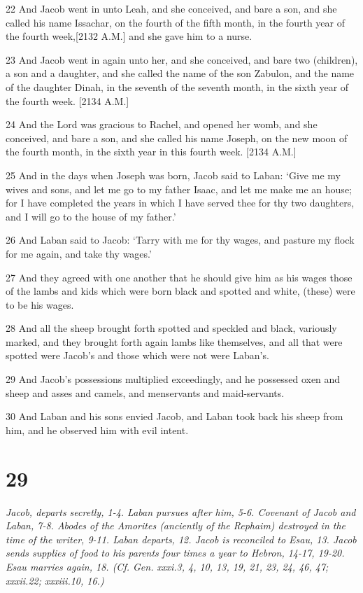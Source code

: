 \par 22 And Jacob went in unto Leah, and she conceived, and bare a son, and she called his name Issachar, on the fourth of the fifth month, in the fourth year of the fourth week,[2132 A.M.] and she gave him to a nurse.
\par 23 And Jacob went in again unto her, and she conceived, and bare two (children), a son and a daughter, and she called the name of the son Zabulon, and the name of the daughter Dinah, in the seventh of the seventh month, in the sixth year of the fourth week. [2134 A.M.]
\par 24 And the Lord was gracious to Rachel, and opened her womb, and she conceived, and bare a son, and she called his name Joseph, on the new moon of the fourth month, in the sixth year in this fourth week. [2134 A.M.]
\par 25 And in the days when Joseph was born, Jacob said to Laban: ‘Give me my wives and sons, and let me go to my father Isaac, and let me make me an house; for I have completed the years in which I have served thee for thy two daughters, and I will go to the house of my father.’
\par 26 And Laban said to Jacob: ‘Tarry with me for thy wages, and pasture my flock for me again, and take thy wages.’
\par 27 And they agreed with one another that he should give him as his wages those of the lambs and kids which were born black and spotted and white, (these) were to be his wages.
\par 28 And all the sheep brought forth spotted and speckled and black, variously marked, and they brought forth again lambs like themselves, and all that were spotted were Jacob's and those which were not were Laban's.
\par 29 And Jacob's possessions multiplied exceedingly, and he possessed oxen and sheep and asses and camels, and menservants and maid-servants.
\par 30 And Laban and his sons envied Jacob, and Laban took back his sheep from him, and he observed him with evil intent.

\chapter{29}

\par \textit{Jacob, departs secretly, 1-4. Laban pursues after him, 5-6. Covenant of Jacob and Laban, 7-8. Abodes of the Amorites (anciently of the Rephaim) destroyed in the time of the writer, 9-11. Laban departs, 12. Jacob is reconciled to Esau, 13. Jacob sends supplies of food to his parents four times a year to Hebron, 14-17, 19-20. Esau marries again, 18. (Cf. Gen. xxxi.3, 4, 10, 13, 19, 21, 23, 24, 46, 47; xxxii.22; xxxiii.10, 16.)}

